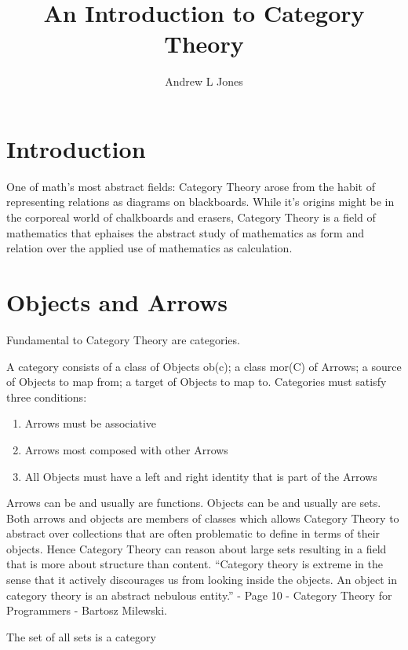 \documentclass{article}
\title{An Introduction to Category Theory}
\author{Andrew L Jones}\date{}
\begin{document}
\maketitle



\section*{Introduction}
One of math's most abstract fields: Category Theory arose from the habit of representing relations as diagrams on blackboards. While it's origins might be in the corporeal world of chalkboards and erasers, Category Theory is a field of mathematics that ephaises the abstract study of mathematics as form and relation over the applied use of mathematics as calculation.


\section{Objects and Arrows}
Fundamental to Category Theory are categories.
\begin{definition}
A category consists of a class of Objects ob(c); a class mor(C) of Arrows; a source of Objects to map from; a target of Objects to map to. Categories must satisfy three conditions:
  \begin{enumerate}
    \item Arrows must be associative
    \item Arrows most composed with other Arrows
    \item All Objects must have a left and right identity that is part of the Arrows
  \end{enumerate}
\end{definition}
Arrows can be and usually are functions. Objects can be and usually are sets. Both arrows and objects are members of classes which allows Category Theory to abstract over collections that are often problematic to define in terms of their objects. Hence Category Theory can reason about large sets resulting in a field that is more about structure than content. “Category theory is extreme in the sense that it actively discourages us from looking inside the objects. An object in category theory is an abstract nebulous entity.” - Page 10 - Category Theory for Programmers - Bartosz Milewski.

\begin{theorem}
  The set of all sets is a category
\end{theorem}
\end{document}
